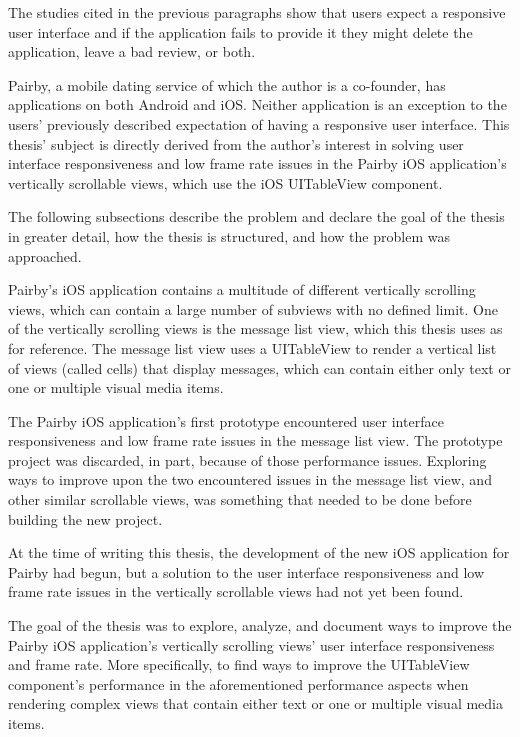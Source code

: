 \documentclass[a4paper,12pt]{article}
\begin{document}
The studies cited in the previous paragraphs show that users expect a responsive user interface and if the application fails to provide it they might delete the application, leave a bad review, or both.

Pairby, a mobile dating service of which the author is a co-founder, has applications on both Android and iOS. Neither application is an exception to the users' previously described expectation of having a responsive user interface. This thesis' subject is directly derived from the author's interest in solving user interface responsiveness and low frame rate issues in the Pairby iOS application's vertically scrollable views, which use the iOS UITableView component.

The following subsections describe the problem and declare the goal of the thesis in greater detail, how the thesis is structured, and how the problem was approached.

Pairby's iOS application contains a multitude of different vertically scrolling views, which can contain a large number of subviews with no defined limit. One of the vertically scrolling views is the message list view, which this thesis uses as for reference. The message list view uses a UITableView to render a vertical list of views (called cells) that display messages, which can contain either only text or one or multiple visual media items.

The Pairby iOS application's first prototype encountered user interface responsiveness and low frame rate issues in the message list view. The prototype project was discarded, in part, because of those performance issues. Exploring ways to improve upon the two encountered issues in the message list view, and other similar scrollable views, was something that needed to be done before building the new project.

At the time of writing this thesis, the development of the new iOS application for Pairby had begun, but a solution to the user interface responsiveness and low frame rate issues in the vertically scrollable views had not yet been found.

\label{subsec:goal-of-the-thesis}
The goal of the thesis was to explore, analyze, and document ways to improve the Pairby iOS application's vertically scrolling views' user interface responsiveness and frame rate. More specifically, to find ways to improve the UITableView component's performance in the aforementioned performance aspects when rendering complex views that contain either text or one or multiple visual media items.
\end{document}

